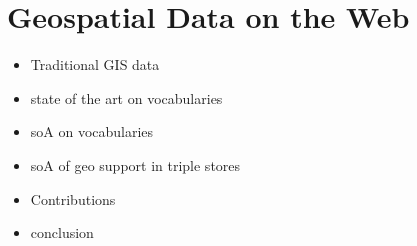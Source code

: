 \chapter{Geospatial Data on the Web}
\label{ch:ch1}

\begin{itemize}
\item Traditional GIS data
\item state of the art on vocabularies
\item soA on vocabularies
\item soA of geo support in triple stores
\item Contributions
\item conclusion
\end{itemize}
